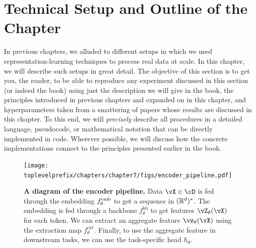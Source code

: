 \documentclass[../../book-main.tex]{subfiles}
\begin{document}



\section{Technical Setup and Outline of the Chapter}\label{sec:experiment_setup}

In previous chapters, we alluded to different setups in which we used representation-learning techniques to process real data at scale. In this chapter, we will describe such setups in great detail. The objective of this section is to get you, the reader, to be able to reproduce any experiment discussed in this section (or indeed the book) using just the description we will give in the book, the principles introduced in previous chapters and expanded on in this chapter, and hyperparameters taken from a smattering of papers whose results are discussed in this chapter. To this end, we will \textit{precisely} describe all procedures in a detailed language, pseudocode, or mathematical notation that can be directly implemented in code. Wherever possible, we will discuss how the concrete implementations connect to the principles presented earlier in the book.

\begin{figure}
    \texttt{[image: \\toplevelprefix/chapters/chapter7/figs/encoder\_pipeline.pdf]}
    \caption{\small\textbf{A diagram of the encoder pipeline.} Data \(\vX \in \cD\) is fed through the embedding \(f_{\theta}^{\mathrm{emb}}\) to get a sequence in \((\mathbb{R}^{d})^{*}\). The embedding is fed through a backbone \(f_{\theta}^{\mathrm{bb}}\) to get features \(\vZ_{\theta}(\vX)\) for each token. We can extract an aggregate feature \(\vz_{\theta}(\vX)\) using the extraction map \(f_{\theta}^{\mathrm{ext}}\). Finally, to use the aggregate feature in downstream tasks, we can use the task-specific head \(h_{\theta}\).}
    \label{fig:overall_encoder_pipeline}
\end{figure}
\end{document}

